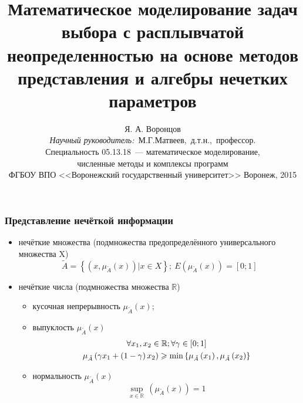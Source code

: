 \documentclass[12pt]{beamer}
\title{\Large{Математическое моделирование задач выбора с расплывчатой неопределенностью на основе методов представления и алгебры нечетких параметров}}
\author{\normalsize{%
Я. А. Воронцов\\%
\emph{Научный руководитель:}~М.Г.Матвеев,~д.т.н.,~профессор.}\\%
\small{
\vspace{2pt}
Специальность 05.13.18~--- математическое моделирование,\\ численные методы и комплексы программ \\
\vspace{2pt}
ФГБОУ ВПО <<Воронежский государственный университет>>%
\vspace{10pt}%
}
\small{Воронеж, 2015}
}
\begin{document}
\maketitle


\begin{frame}
  \frametitle{Представление нечёткой информации}
  \begin{itemize}
    \item нечёткие множества (подмножества предопределённого универсального множества X)
      \begin{equation}
      	\tilde{A}=\left\{ \left( x, \mu_{\tilde A}\left( x \right) \right)\left| x\in X \right. \right\};\ E \left( \mu_{\tilde A} \left( x \right) \right) = \left[0; 1 \right]
      \end{equation}      
    \item нечёткие числа (подмножества множества $\mathbb{R}$)
      \begin{itemize}
        \item кусочная непрерывность $\mu_{\tilde A}\left( x \right)$;
        \item выпуклость $\mu_{\tilde A}\left( x \right)$
      	\begin{gather}
      	  \forall x_1, x_2 \in \mathbb{R}; \forall \gamma \in \left[ 0;1 \right] \notag \\
      	  \mu_{\tilde A}\left( \gamma x_1+\left( 1-\gamma  \right)x_2 \right)\geqslant \min \left\{ \mu_{\tilde A}\left( x_1 \right),\mu_{\tilde A}\left( x_2 \right) \right\}
      	\end{gather}
      	\item нормальность $\mu_{\tilde A}\left( x \right)$
        	\begin{equation}
        		\underset{x\in \mathbb{R}}{\mathop {\sup}}{}\, \left( \mu_{\tilde A} \left( x \right) \right)=1
        	\end{equation}
      \end{itemize}
  \end{itemize}
\end{frame}


\end{document}
